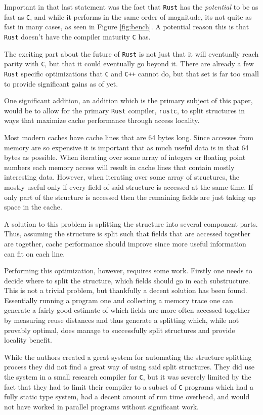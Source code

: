 \documentclass[12pt,oneside]{book}
\newcommand{\rustname}{{\texttt{Rust}}}
\def \rust {\rustname{}\xspace}
\newcommand{\rustcname}{{\texttt{rustc}}}
\def \rustc {\rustcname{}\xspace}
\newcommand{\cname}{{\texttt{C}}}
\def \c {\cname{}\xspace}
\newcommand{\cppname}{{\texttt{C++}}}
\def \cpp {\cppname{}\xspace}
\begin{document}
Important in that last statement was the fact that \rust has the 
\textit{potential}
to be as fast as \c, and while it performs in the same order of magnitude, its not
quite as fast in many cases, as seen in Figure \ref{fig:bench}.
A potential reason this is that \rust doesn't have the compiler maturity \c has.

The exciting part about the future of \rust is not just that it will eventually
reach parity with \c, but that it could eventually go beyond it. There are
already a few \rust specific optimizations that \c and \cpp cannot do, but that
set is far too small to provide significant gains as of yet.

One significant addition, an addition which is the primary subject of this
paper, would be to allow for the primary \rust compiler, \rustc, to split
structures in ways that maximize cache performance through access locality.

Most modern caches have cache lines that are 64 bytes long. Since accesses from
memory are so expensive it is important that as much useful data is in that 64
bytes as possible. When iterating over some array of integers or floating point
numbers each memory access will result in cache lines that contain mostly
interesting data. However, when iterating over some array of structures,
the mostly useful only
if every field of said structure is accessed at the same time. If only part of
the structure is accessed then the remaining fields are just taking up space in
the cache.

A solution to this problem is splitting the structure into several component
parts. Thus, assuming the structure is split such that fields that are accessed
together are together, cache performance should improve since more useful 
information can fit on each line.

Performing this optimization, however, requires some work. Firstly one
needs to decide where to split the structure, which fields should go in
each substructure. This is not a trivial problem, but thankfully a decent
solution has been found\cite{Zhong:2004:ARS:996893.996872}.
Essentially running a program one and collecting
a memory trace one can generate a fairly good estimate of which fields are more
often accessed together by measuring reuse distances and 
thus generate a splitting which, while not provably optimal, 
does manage to successfully split structures and
provide locality benefit.

While the authors created a great system for automating the structure splitting 
process they did not find a great way of using said split structures. They did
use the system in a small research compiler for \c, but it was severely limited
by the fact that they had to limit their compiler to a subset of \c programs
which had a fully static type system, had a decent amount of run time overhead, 
and would not have worked in parallel programs without significant work.
\end{document}
